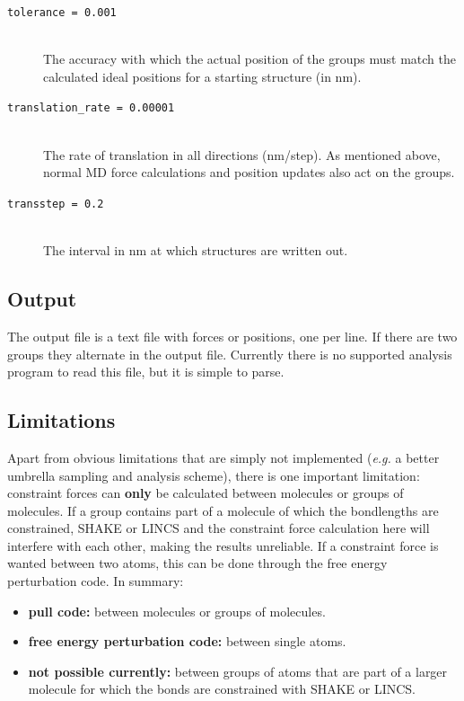 \begin{description}
\item[\tt tolerance                = 0.001]\mbox{}\\
The accuracy with which the actual position of the groups must match
the calculated ideal positions for a starting structure (in nm).
 
\item[\tt translation\_rate         = 0.00001]\mbox{}\\
The rate of translation in all directions (nm/step). As mentioned
above, normal MD force calculations and position updates also act on
the groups.

\item[\tt transstep                = 0.2]\mbox{}\\
The interval in nm at which structures are written out. 

\end{description}

\subsection{Output}
The output file is a text file with forces or positions, one per
line. If there are two groups they alternate in the output
file. Currently there is no supported analysis program to read this
file, but it is simple to parse.

\subsection{Limitations}
Apart from obvious limitations that are simply not implemented (\emph{e.g.} a
better umbrella sampling and analysis scheme), there is one important
limitation: constraint forces can \textbf{only} be calculated between
molecules or groups of molecules. If a group contains part of a
molecule of which the bondlengths are constrained, SHAKE or LINCS and
the constraint force calculation here will interfere with each other,
making the results unreliable. If a constraint force is wanted between
two atoms, this can be done through the free energy perturbation
code. In summary: 

\begin{itemize}
\item{\bf pull code:} between molecules or groups of molecules.
\item{\bf free energy perturbation code:} between single atoms. 
\item{\bf not possible currently:} between groups of atoms that are
part of a larger molecule for which the bonds are constrained with
SHAKE or LINCS.
\end{itemize}

